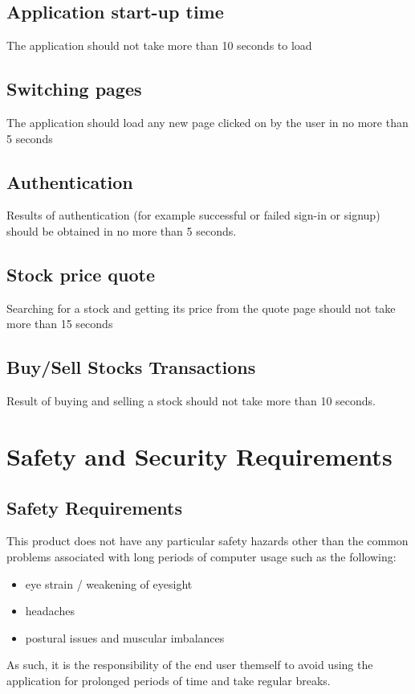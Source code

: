 \documentclass[12 pt, a4paper]{report}
\begin{document}
	\subsection{Application start-up time}
	The application should not take more than 10 seconds to load
	\subsection{Switching pages}
	The application should load any new page clicked on by the user in no more than 5 seconds
	\subsection{Authentication}
	Results of authentication (for example successful or failed sign-in or signup) should be obtained in no more than 5 seconds.
	\subsection{Stock price quote}
	Searching for a stock and getting its price from the quote page should not take more than 15 seconds
	\subsection{Buy/Sell Stocks Transactions}
	Result of buying and selling a stock should not take more than 10 seconds.
	
	
	\section {Safety and Security Requirements}
	\subsection{Safety Requirements}
	This product does not have any particular safety hazards other than the common problems associated with long periods of computer usage such as the following:
	\begin{itemize}
		\item eye strain / weakening of eyesight
		\item headaches
		\item postural issues and muscular imbalances
	\end{itemize}
	As such, it is the responsibility of the end user themself to avoid using the application for prolonged periods of time and take regular breaks.
	
\end{document}
